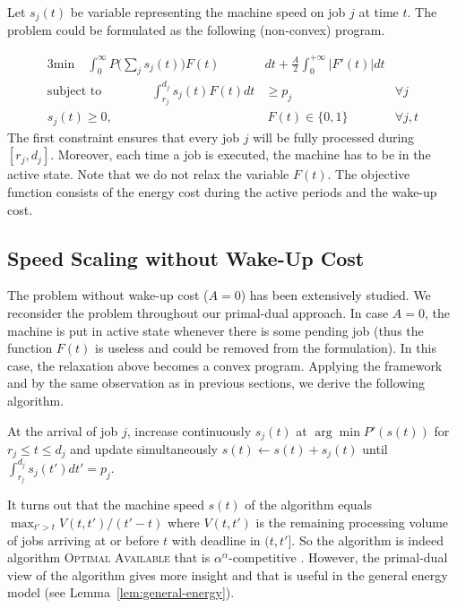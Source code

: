 \documentclass[11pt]{article}
\begin{document}
Let $s_{j}(t)$ be variable representing the machine speed on job $j$ at time $t$.   
The problem could be formulated as the following (non-convex) program.
 
  \begin{alignat*}{3}
    \text{min} \quad  \int_{0}^{\infty} P\biggl(\sum_{j} s_{j}(t) \biggl)F(t) &dt + \frac{A}{2} \int_{0}^{+\infty} |F'(t)|dt \\
\text{subject to} \qquad \qquad     \int_{r_{j}}^{d_{j}} s_{j}(t) F(t)dt &\geq p_{j} \qquad &\forall j \\
					     s_{j}(t) \geq 0, &~F(t) \in \{0,1\} \qquad &\forall j,t
  \end{alignat*}
The first constraint ensures that every job $j$ will be fully processed during $[r_{j},d_{j}]$.
Moreover, each time a job is executed, the machine has to be in the active state. 
Note that we do not relax the variable $F(t)$. The objective function consists of 
the energy cost during the active periods and the wake-up cost. 

\subsection{Speed Scaling without Wake-Up Cost}
The problem without wake-up cost ($A = 0$) has been extensively studied. 
We reconsider the problem throughout our primal-dual approach. In case $A = 0$,
the machine is put in active state whenever there is some pending job (thus the function
$F(t)$ is useless and could be removed from the formulation).  
In this case, the relaxation above becomes a convex program. Applying the framework and by the same
observation as in previous sections, we derive the following algorithm.

At the arrival of job $j$, increase continuously $s_{j}(t)$ at $\arg \min P'(s(t))$ for $r_{j} \leq t \leq d_{j}$
and update simultaneously $s(t) \gets s(t) + s_{j}(t)$ until $\int_{r_{j}}^{d_{j}} s_{j}(t')dt' = p_{j}$.

It turns out that the machine speed $s(t)$ of the algorithm equals $\max_{t' > t} V(t,t')/(t' - t)$
where $V(t,t')$ is the remaining processing volume of jobs arriving at or before $t$
with deadline in $(t,t']$. So the algorithm is indeed algorithm \textsc{Optimal Available} \cite{YaoDemers95:A-Scheduling-Model}
that is $\alpha^{\alpha}$-competitive \cite{BansalKimbrel07:Speed-scaling}.
However, the primal-dual view of the algorithm gives more insight and that is useful 
in the general energy model (see Lemma~\ref{lem:general-energy}). 
\end{document}
